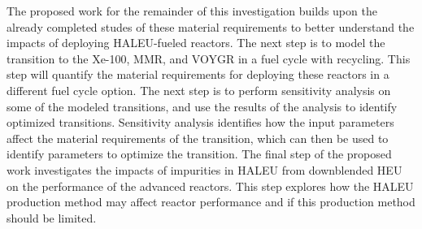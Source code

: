 The proposed work for the remainder of this investigation builds upon 
the already completed studes of these material requirements to 
better understand the impacts of deploying 
\gls{HALEU}-fueled reactors. The next step is to model the transition to 
the Xe-100, \gls{MMR}, and VOYGR in a fuel cycle with recycling. This 
step will 
quantify the material requirements for deploying these reactors in 
a different fuel cycle option. The next step is to perform sensitivity 
analysis on some of the modeled transitions, and use the results of 
the analysis to identify optimized transitions. Sensitivity analysis 
identifies how the input parameters affect 
the material requirements of the transition, which can then be used to 
identify parameters to optimize the transition. The final step of the 
proposed work investigates the impacts of impurities in 
\gls{HALEU} from downblended \gls{HEU} on the performance of the 
advanced reactors. This step explores how the \gls{HALEU} production 
method may affect reactor performance and if this production method 
should be limited. 